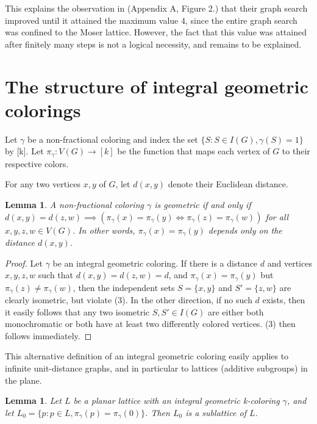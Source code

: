 \documentclass{article}
\newtheorem{lemma}[theorem]{Lemma}
\begin{document}
This explains the observation in \cite{matolcsi2025fractionalchromaticnumberplane} (Appendix A, Figure 2.) that their graph search improved until it attained the maximum value 4, since the entire graph search was confined to the Moser lattice. However, the fact that this value was attained after finitely many steps is not a logical necessity, and remains to be explained.

\section{The structure of integral geometric colorings}

Let $\gamma$ be a non-fractional coloring and index the set $\{S: S\in I(G), \gamma(S) = 1\}$ by [k]. Let $\pi_\gamma: V(G) \rightarrow [k]$ be the function that maps each vertex of $G$ to their respective colors.

For any two vertices $x,y$ of $G$, let $d(x,y)$ denote their Euclidean distance.

\begin{lemma}
    A non-fractional coloring $\gamma$ is geometric if and only if $d(x,y) = d(z,w) \implies (\pi_\gamma(x) = \pi_\gamma(y) \iff \pi_\gamma(z) = \pi_\gamma(w))$ for all $x,y,z,w \in V(G)$. In other words, $\pi_\gamma(x) = \pi_\gamma(y)$ depends only on the distance $d(x,y)$. 
\end{lemma}

\begin{proof}
    Let $\gamma$ be an integral geometric coloring. If there is a distance $d$ and vertices $x,y,z,w$ such that $d(x,y) = d(z,w) = d$, and $\pi_\gamma(x) = \pi_\gamma(y)$ but $\pi_\gamma(z) \not= \pi_\gamma(w)$, then the independent sets $S=\{x, y\}$ and $S'=\{z,w\}$ are clearly isometric, but violate (3). In the other direction, if no such $d$ exists, then it easily follows that any two isometric $S, S' \in I(G)$ are either both monochromatic or both have at least two differently colored vertices. (3) then follows immediately.
\end{proof}

This alternative definition of an integral geometric coloring easily applies to infinite unit-distance graphs, and in particular to lattices (additive subgroups) in the plane.

\begin{lemma}
    Let $L$ be a planar lattice with an integral geometric k-coloring $\gamma$, and let $L_0 = \{ p: p\in L, \pi_\gamma(p) = \pi_\gamma(0) \}$. Then $L_0$ is a sublattice of $L$.
\end{lemma}
\end{document}
